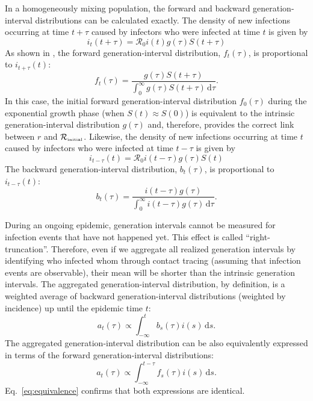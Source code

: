 \documentclass[12pt]{article}
\newcommand{\eref}[1]{Eq.~\ref{eq:#1}}
\newcommand{\Rx}[1]{\ensuremath{{\mathcal R}_{#1}}\xspace}
\newcommand{\RR}{\ensuremath{{\mathcal R}}}
\newcommand{\Rini}{\Rx{\textrm{\tiny initial}}}
\begin{document}
In a homogeneously mixing population, the forward and backward generation-interval distributions can be calculated exactly.
The density of new infections occurring at time $t+\tau$ caused by infectors who were infected at time $t$ is given by
\begin{equation}
i_{t}(t+\tau) = \RR_0 i(t) g(\tau) S(t+\tau)
\end{equation}
As shown in \cite{champredon2015intrinsic}, the forward generation-interval distribution, $f_t(\tau)$, is proportional to $i_{t+\tau}(t)$:
\begin{equation}
f_t(\tau) = \frac{g(\tau) S(t+\tau)}{\int_0^\infty g(\tau) S(t+\tau) \,\mathrm{d}\tau}.
\label{eq:forward}
\end{equation}
In this case, the initial forward generation-interval distribution $f_0(\tau)$ during the exponential growth phase (when $S(t) \approx S(0)$) is equivalent to the intrinsic generation-interval distribution $g(\tau)$ and, therefore, provides the correct link between $r$ and \Rini.
Likewise, the density of new infections occurring at time $t$ caused by infectors who were infected at time $t-\tau$ is given by
\begin{equation}
i_{t-\tau}(t) = \RR_0 i(t-\tau) g(\tau) S(t)
\end{equation}
The backward generation-interval distribution, $b_t(\tau)$, is proportional to $i_{t-\tau}(t)$:
\begin{equation}
b_t(\tau) = \frac{i(t-\tau) g(\tau)}{\int_0^\infty i(t-\tau) g(\tau)\,\mathrm{d}\tau}.
\end{equation}

During an ongoing epidemic, generation intervals cannot be measured for infection events that have not happened yet.
This effect is called ``right-truncation''.
Therefore, even if we aggregate all realized generation intervals by identifying who infected whom through contact tracing (assuming that infection events are observable), their mean will be shorter than the intrinsic generation intervals.
The aggregated generation-interval distribution, by definition, is a weighted average of backward generation-interval distributions (weighted by incidence) up until the epidemic time $t$:
\begin{equation}
a_t(\tau) \propto \int_{-\infty}^t b_s(\tau) i(s) \,\mathrm{d}s.
\end{equation}
The aggregated generation-interval distribution can be also equivalently expressed in terms of the forward generation-interval distributions:
\begin{equation}
a_t(\tau) \propto \int_{-\infty}^{t-\tau} f_s(\tau) i(s) \,\mathrm{d}s.
\end{equation}
\eref{equivalence} confirms that both expressions are identical.
\end{document}
